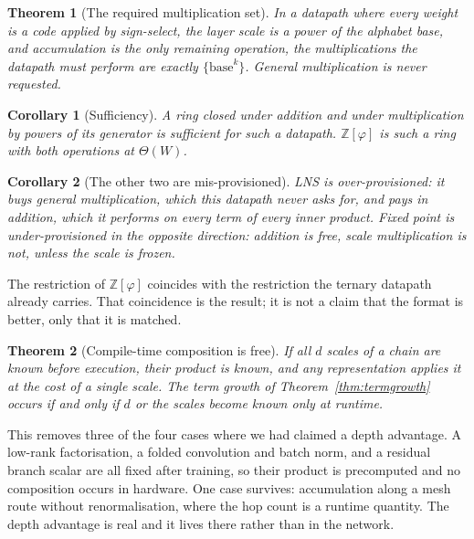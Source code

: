 \documentclass[11pt]{article}
\newtheorem{theorem}{Theorem}
\newtheorem{corollary}{Corollary}
\theoremstyle{definition}
\begin{document}
\begin{theorem}[The required multiplication set]
\label{thm:reqmul}
In a datapath where every weight is a code applied by sign-select, the layer
scale is a power of the alphabet base, and accumulation is the only remaining
operation, the multiplications the datapath must perform are exactly
$\{\text{base}^{k}\}$. General multiplication is never requested.
\end{theorem}

\begin{corollary}[Sufficiency]
\label{cor:sufficiency}
A ring closed under addition and under multiplication by powers of its generator
is sufficient for such a datapath. $\mathbb{Z}[\varphi]$ is such a ring with both
operations at $\Theta(W)$.
\end{corollary}

\begin{corollary}[The other two are mis-provisioned]
\label{cor:misprov}
LNS is over-provisioned: it buys general multiplication, which this datapath
never asks for, and pays in addition, which it performs on every term of every
inner product. Fixed point is under-provisioned in the opposite direction:
addition is free, scale multiplication is not, unless the scale is frozen.
\end{corollary}

The restriction of $\mathbb{Z}[\varphi]$ coincides with the restriction the
ternary datapath already carries. That coincidence is the result; it is not a
claim that the format is better, only that it is matched.

\begin{theorem}[Compile-time composition is free]
\label{thm:compilecomp}
If all $d$ scales of a chain are known before execution, their product is known,
and any representation applies it at the cost of a single scale. The term growth
of Theorem~\ref{thm:termgrowth} occurs if and only if $d$ or the scales become
known only at runtime.
\end{theorem}

This removes three of the four cases where we had claimed a depth advantage. A
low-rank factorisation, a folded convolution and batch norm, and a residual
branch scalar are all fixed after training, so their product is precomputed and
no composition occurs in hardware. One case survives: accumulation along a mesh
route without renormalisation, where the hop count is a runtime quantity. The
depth advantage is real and it lives there rather than in the network.
\end{document}
